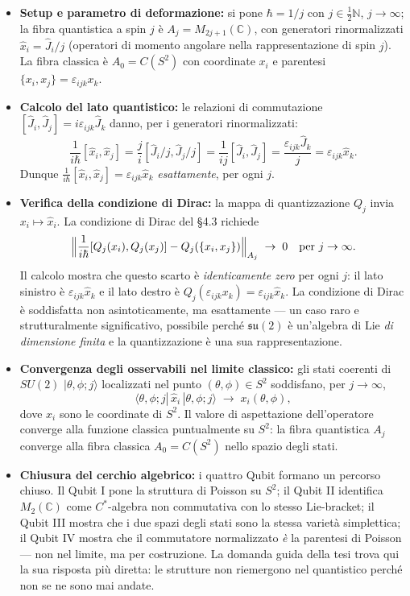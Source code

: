 \documentclass[12pt, a4paper]{article}
\begin{document}
	\begin{itemize}
		\item \textbf{Setup e parametro di deformazione:} si pone $\hbar=1/j$ con
		$j\in\tfrac{1}{2}\mathbb{N}$, $j\to\infty$; la fibra quantistica a spin $j$ è
		$A_j=M_{2j+1}(\mathbb{C})$, con generatori rinormalizzati $\hat x_i=\hat J_i/j$
		(operatori di momento angolare nella rappresentazione di spin $j$). La fibra
		classica è $A_0=C(S^2)$ con coordinate $x_i$ e parentesi
		$\{x_i,x_j\}=\varepsilon_{ijk}x_k$.
		
		\item \textbf{Calcolo del lato quantistico:} le relazioni di commutazione
		$[\hat J_i,\hat J_j]=i\varepsilon_{ijk}\hat J_k$ danno, per i generatori
		rinormalizzati:
		\[
		\frac{1}{i\hbar}[\hat x_i,\hat x_j]
		=\frac{j}{i}[\hat J_i/j,\hat J_j/j]
		=\frac{1}{ij}[\hat J_i,\hat J_j]
		=\frac{\varepsilon_{ijk}\hat J_k}{j}
		=\varepsilon_{ijk}\hat x_k.
		\]
		Dunque $\frac{1}{i\hbar}[\hat x_i,\hat x_j]=\varepsilon_{ijk}\hat x_k$
		\emph{esattamente}, per ogni $j$.
		
		\item \textbf{Verifica della condizione di Dirac:} la mappa di quantizzazione
		$Q_j$ invia $x_i\mapsto\hat x_i$. La condizione di Dirac del \S4.3 richiede
		\[
		\Bigl\|\frac{1}{i\hbar}[Q_j(x_i),Q_j(x_j)] - Q_j(\{x_i,x_j\})\Bigr\|_{A_j}
		\;\to\; 0 \quad\text{per }j\to\infty.
		\]
		Il calcolo mostra che questo scarto è \emph{identicamente zero} per ogni $j$:
		il lato sinistro è $\varepsilon_{ijk}\hat x_k$ e il lato destro è
		$Q_j(\varepsilon_{ijk}x_k)=\varepsilon_{ijk}\hat x_k$. La condizione di Dirac
		è soddisfatta non asintoticamente, ma esattamente --- un caso raro e strutturalmente
		significativo, possibile perché $\mathfrak{su}(2)$ è un'algebra di Lie
		\emph{di dimensione finita} e la quantizzazione è una sua rappresentazione.
		
		\item \textbf{Convergenza degli osservabili nel limite classico:}
		gli stati coerenti di $SU(2)$ $|\theta,\phi;j\rangle$ localizzati nel punto
		$(\theta,\phi)\in S^2$ soddisfano, per $j\to\infty$,
		\[
		\langle\theta,\phi;j|\,\hat x_i\,|\theta,\phi;j\rangle \;\to\; x_i(\theta,\phi),
		\]
		dove $x_i$ sono le coordinate di $S^2$. Il valore di aspettazione dell'operatore
		converge alla funzione classica puntualmente su $S^2$: la fibra quantistica
		$A_j$ converge alla fibra classica $A_0=C(S^2)$ nello spazio degli stati.
		
		\item \textbf{Chiusura del cerchio algebrico:} i quattro Qubit formano un
		percorso chiuso. Il Qubit I pone la struttura di Poisson su $S^2$; il Qubit II
		identifica $M_2(\mathbb{C})$ come $C^*$-algebra non commutativa con lo stesso
		Lie-bracket; il Qubit III mostra che i due spazi degli stati sono la stessa
		varietà simplettica; il Qubit IV mostra che il commutatore normalizzato
		\emph{è} la parentesi di Poisson --- non nel limite, ma per costruzione.
		La domanda guida della tesi trova qui la sua risposta più diretta: le strutture
		non riemergono nel quantistico perché non se ne sono mai andate.
	\end{itemize}
	
\end{document}
